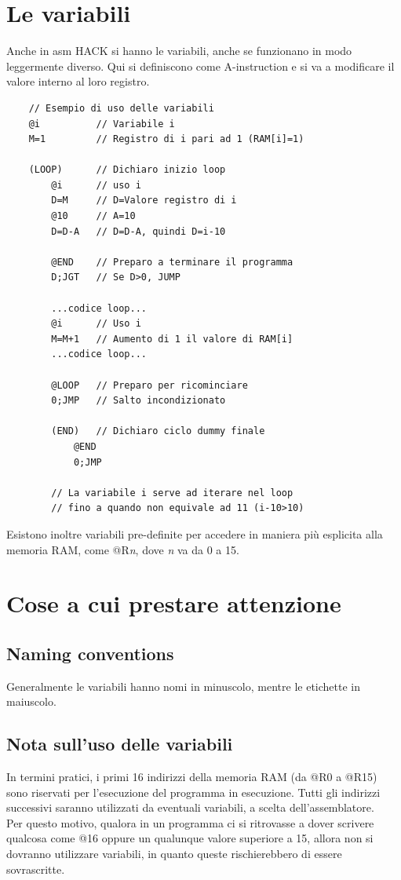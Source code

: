 \documentclass[12pt]{article}
\begin{document}
\section{Le variabili}
Anche in asm HACK si hanno le variabili, anche se funzionano in modo leggermente diverso.
Qui si definiscono come A-instruction e si va a modificare il valore interno al loro registro.
\begin{lstlisting}
    // Esempio di uso delle variabili
    @i          // Variabile i
    M=1         // Registro di i pari ad 1 (RAM[i]=1)

    (LOOP)      // Dichiaro inizio loop
        @i      // uso i
        D=M     // D=Valore registro di i
        @10     // A=10
        D=D-A   // D=D-A, quindi D=i-10

        @END    // Preparo a terminare il programma
        D;JGT   // Se D>0, JUMP

        ...codice loop...
        @i      // Uso i
        M=M+1   // Aumento di 1 il valore di RAM[i]
        ...codice loop...

        @LOOP   // Preparo per ricominciare
        0;JMP   // Salto incondizionato
    
        (END)   // Dichiaro ciclo dummy finale
            @END
            0;JMP
        
        // La variabile i serve ad iterare nel loop
        // fino a quando non equivale ad 11 (i-10>10)
\end{lstlisting}
Esistono inoltre variabili pre-definite per accedere in maniera più esplicita alla memoria RAM, come @R\textit{n}, dove \textit{n} va da 0 a 15. 
\pagebreak
\section{Cose a cui prestare attenzione}

\subsection{Naming conventions}
Generalmente le variabili hanno nomi in minuscolo, mentre le etichette in maiuscolo.

\subsection{Nota sull'uso delle variabili}
In termini pratici, i primi 16 indirizzi della memoria RAM (da @R0 a @R15) sono riservati per l'esecuzione del programma in esecuzione.
Tutti gli indirizzi successivi saranno utilizzati da eventuali variabili, a scelta dell'assemblatore. \\
Per questo motivo, qualora in un programma ci si ritrovasse a dover scrivere qualcosa come @16 oppure un qualunque valore superiore a 15, allora non si dovranno utilizzare variabili, in quanto queste rischierebbero di essere sovrascritte.
\end{document}
